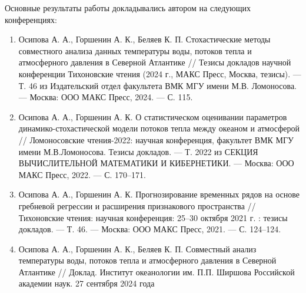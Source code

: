 {\probation}
Основные результаты работы докладывались автором
на следующих конференциях:
\begin{enumerate}[beginpenalty=10000]
	\item Осипова А. А., Горшенин А. К., Беляев К. П. Стохастические методы совместного анализа данных температуры воды, потоков тепла и атмосферного давления в Северной Атлантике // Тезисы докладов научной конференции Тихоновские чтения (2024 г., МАКС Пресс, Москва, тезисы). — Т. 46 из Издательский отдел факультета ВМК МГУ имени М.В. Ломоносова. — Москва: ООО МАКС Пресс, 2024. — С. 115.
	\item Осипова А. А., Горшенин А. К. О статистическом оценивании параметров динамико-стохастической модели потоков тепла между океаном и атмосферой // Ломоносовские чтения-2022: научная конференция, факультет ВМК МГУ имени М.В.Ломоносова. Тезисы докладов. — Т. 2022 из СЕКЦИЯ ВЫЧИСЛИТЕЛЬНОЙ МАТЕМАТИКИ И КИБЕРНЕТИКИ. — Москва: ООО МАКС Пресс, 2022. — С. 170–171.
	\item Осипова А. А., Горшенин А. К. Прогнозирование временных рядов на основе гребневой регрессии и расширения признакового пространства // Тихоновские чтения: научная конференция: 25–30 октября 2021 г. : тезисы докладов. — Т. 46. — Москва: ООО МАКС Пресс, 2021. — С. 124–124.
	\item Осипова А. А., Горшенин А. К., Беляев К. П. Совместный анализ температуры воды,
	потоков тепла и атмосферного давления в
	Северной Атлантике // Доклад. Институт океанологии им. П.П. Ширшова Российской академии наук. 27 сентября 2024 года
\end{enumerate}


